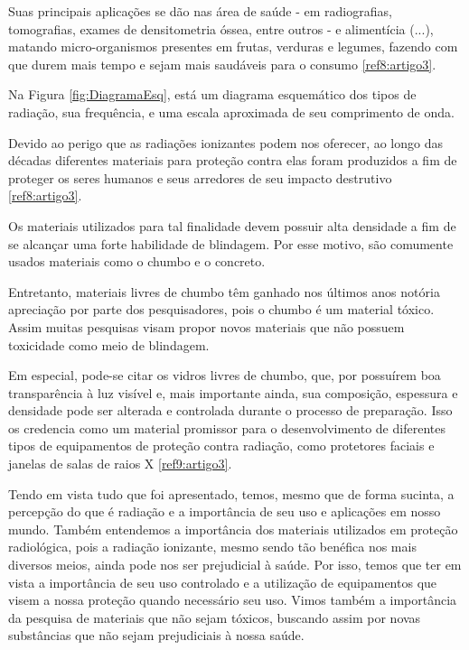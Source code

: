 \begin{multicols}{2}

Suas principais aplicações se dão nas área de saúde - em radiografias, tomografias, exames de densitometria óssea, entre outros - e alimentícia (...), matando micro-organismos presentes em frutas, verduras e legumes, fazendo com que durem mais tempo e sejam mais saudáveis para o consumo \ref{ref8:artigo3}.

Na Figura \ref{fig:DiagramaEsq}, está um diagrama esquemático dos tipos de radiação, sua frequência, e uma escala aproximada de seu comprimento de onda.


Devido ao perigo que as radiações ionizantes podem nos oferecer, ao longo das décadas diferentes materiais para proteção contra elas foram produzidos a fim de proteger os seres humanos e seus arredores de seu impacto destrutivo \ref{ref8:artigo3}.

Os materiais utilizados para tal finalidade devem possuir alta densidade a fim de se alcançar uma forte habilidade de blindagem. Por esse motivo, são comumente usados materiais como o chumbo e o concreto.

Entretanto, materiais livres de chumbo têm ganhado nos últimos anos notória apreciação por parte dos pesquisadores, pois o chumbo é um material tóxico. Assim muitas pesquisas visam propor novos materiais que não possuem toxicidade como meio de blindagem. 

Em especial, pode-se citar os vidros livres de chumbo, que, por possuírem boa transparência à luz visível e, mais importante ainda, sua composição, espessura e densidade pode ser alterada e controlada durante o processo de preparação. Isso os credencia como um material promissor para o desenvolvimento de diferentes tipos de equipamentos de proteção contra radiação, como protetores faciais e janelas de salas de raios X \ref{ref9:artigo3}.

Tendo em vista tudo que foi apresentado, temos, mesmo que de forma sucinta, a percepção do que é radiação e a importância de seu uso e aplicações em nosso mundo. Também entendemos a importância dos materiais utilizados em proteção radiológica, pois a radiação ionizante, mesmo sendo tão benéfica nos mais diversos meios, ainda pode nos ser prejudicial à saúde. Por isso, temos que ter em vista a importância de seu uso controlado e a utilização de equipamentos que visem a nossa proteção quando necessário seu uso. Vimos também a importância da pesquisa de materiais que não sejam tóxicos, buscando assim por novas substâncias que não sejam prejudiciais à nossa saúde.





\end{multicols}